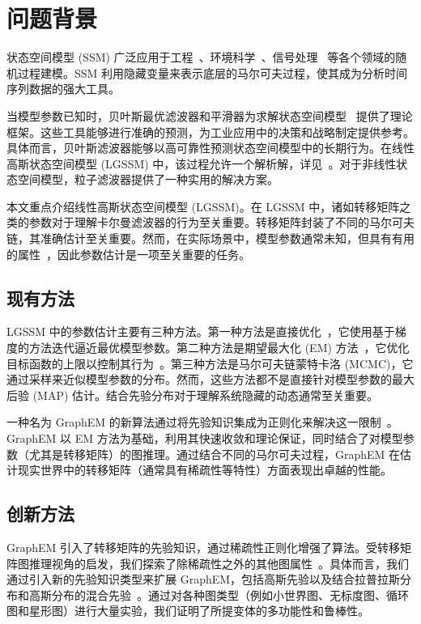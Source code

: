 \section{问题背景}
状态空间模型 (SSM) 广泛应用于工程~\cite{hamilton1994state, kim2017state}、环境科学~\cite{choi2023urban_phd_environ}、信号处理~\cite{dabush2024kalman_tracking_network_dynamic} 等各个领域的随机过程建模。SSM 利用隐藏变量来表示底层的马尔可夫过程，使其成为分析时间序列数据的强大工具。

当模型参数已知时，贝叶斯最优滤波器和平滑器为求解状态空间模型~\cite{Särkkä_Svensson_2023_textbook} 提供了理论框架。这些工具能够进行准确的预测，为工业应用中的决策和战略制定提供参考。具体而言，贝叶斯滤波器能够以高可靠性预测状态空间模型中的长期行为。在线性高斯状态空间模型 (LGSSM) 中，该过程允许一个解析解，详见~\cite{Särkkä_Svensson_2023_textbook}。对于非线性状态空间模型，粒子滤波器提供了一种实用的解决方案。

本文重点介绍线性高斯状态空间模型 (LGSSM)。在 LGSSM 中，诸如转移矩阵之类的参数对于理解卡尔曼滤波器的行为至关重要。转移矩阵封装了不同的马尔可夫链，其准确估计至关重要。然而，在实际场景中，模型参数通常未知，但具有有用的属性~\cite{watts1998collective}，因此参数估计是一项至关重要的任务。

\subsection{现有方法}
LGSSM 中的参数估计主要有三种方法。第一种方法是直接优化~\cite{gupta1974computational}，它使用基于梯度的方法迭代逼近最优模型参数。第二种方法是期望最大化 (EM) 方法~\cite{neal1998view}，它优化目标函数的上限以控制其行为~\cite{shumway1982approach, Särkkä_Svensson_2023_textbook}。第三种方法是马尔可夫链蒙特卡洛 (MCMC)，它通过采样来近似模型参数的分布。然而，这些方法都不是直接针对模型参数的最大后验 (MAP) 估计。结合先验分布对于理解系统隐藏的动态通常至关重要。

一种名为 GraphEM 的新算法通过将先验知识集成为正则化来解决这一限制~\cite{chouzenoux2020GraphEM}。 GraphEM 以 EM 方法为基础，利用其快速收敛和理论保证，同时结合了对模型参数（尤其是转移矩阵）的图推理。通过结合不同的马尔可夫过程，GraphEM 在估计现实世界中的转移矩阵（通常具有稀疏性等特性）方面表现出卓越的性能。

\subsection{创新方法}
GraphEM 引入了转移矩阵的先验知识，通过稀疏性正则化增强了算法。受转移矩阵图推理视角的启发，我们探索了除稀疏性之外的其他图属性~\cite{granger1969investigating, ravazzi2017learning}。具体而言，我们通过引入新的先验知识类型来扩展 GraphEM，包括高斯先验以及结合拉普拉斯分布和高斯分布的混合先验~\cite{zou2005regularization}。通过对各种图类型（例如小世界图、无标度图、循环图和星形图）进行大量实验，我们证明了所提变体的多功能性和鲁棒性。

